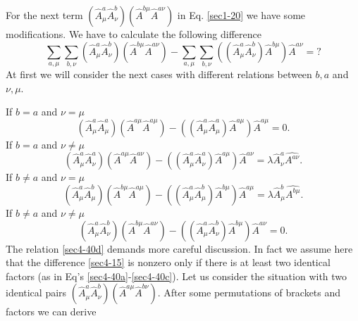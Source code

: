 \documentclass[a4paper,a4paper]{article}
\begin{document}
For the next term 
$(\hat A^a_\mu \hat A^b_\nu )
(\hat A^{b\mu} \hat A^{a\nu} ) 
$
in Eq. \eqref{sec1-20} we have some modifications. We have to calculate 
the following difference 
\begin{equation}
  \sum_{a, \mu} \sum_{b, \nu}
  \left(
  \hat{A}^a_\mu \hat{A}^b_\nu
  \right) 
  \left( 
  \hat{A}^{b \mu} \hat{A}^{a \nu} 
  \right) - 
  \sum_{a, \mu} \sum_{b, \nu} 
  \left( \left( \hat{A}^a_\mu \hat{A}^b_\nu 
  \right) \hat{A}^{b \mu} \right) \hat{A}^{a \nu} = ? 
\label{sec4-15}
\end{equation}
At first we will consider the next cases with different relations 
between $b,a$ and $\nu , \mu$.
\par
\noindent
If $b = a$ and $\nu = \mu$ 
\begin{equation}
\left (
\hat A^a_\mu \hat A^a_\mu
\right )
\left (
\hat A^{a\mu} \hat A^{a\mu}
\right ) - 
\left (
  \left (
  \hat A^a_\mu \hat A^a_\mu
  \right ) \hat A^{a\mu}
\right ) \hat A^{a\mu} = 0 .  
\label{sec4-40a}
\end{equation}
If $b = a$ and $\nu \neq \mu$ 
\begin{equation}
\left (
\hat A^a_\mu \hat A^a_\nu
\right )
\left (
\hat A^{a\mu} \hat A^{a\nu}
\right ) - 
\left (
  \left (
  \hat A^a_\mu \hat A^a_\nu
  \right ) \hat A^{a\mu}
\right ) \hat A^{a\nu} = 
\lambda \hat{A}^a_\nu \hat{A^{a \nu}} . 
\label{sec4-40b}
\end{equation}
If $b \neq a$ and $\nu = \mu$ 
\begin{equation}
\left (
\hat A^a_\mu \hat A^b_\mu
\right )
\left (
\hat A^{b\mu} \hat A^{a\mu}
\right ) - 
\left (
  \left (
  \hat A^a_\mu \hat A^b_\mu
  \right ) \hat A^{b\mu}
\right ) \hat A^{a\mu} = 
\lambda \hat{A}^b_\mu \hat{A^{b \mu}} . 
\label{sec4-40c}
\end{equation}
If $b \neq a$ and $\nu \neq \mu$ 
\begin{equation}
\left (
\hat A^a_\mu \hat A^b_\nu
\right )
\left (
\hat A^{b\mu} \hat A^{a\nu}
\right ) - 
\left (
  \left (
  \hat A^a_\mu \hat A^b_\nu
  \right ) \hat A^{b\mu}
\right ) \hat A^{a\nu} = 0 .
\label{sec4-40d}
\end{equation}
The relation \eqref{sec4-40d} demands more careful discussion. 
In fact we assume here that the difference \eqref{sec4-15} is nonzero 
only if there is at least two identical factors 
(as in Eq's \eqref{sec4-40a}-\eqref{sec4-40c}). Let us consider the 
situation with two identical pairs 
$(\hat A^a_\mu \hat A^b_\nu)(\hat A^{a \mu} \hat A^{b \nu})$. 
After some permutations of brackets and factors we can derive 
\end{document}
